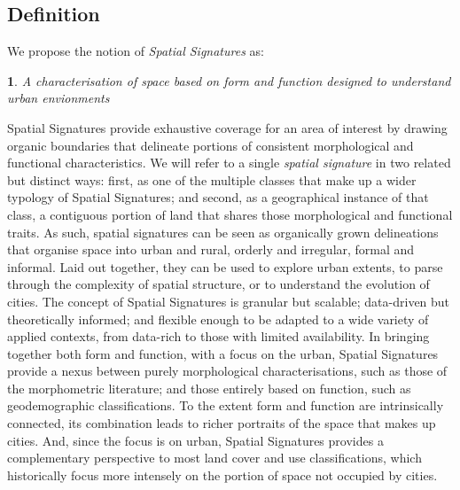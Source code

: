 \subsection{Definition}
\label{ssec:ss_def}

We propose the notion of \textit{Spatial Signatures} as:

\newtheorem*{theorem}{}
\begin{theorem}
A characterisation of space based on form and function designed to understand
urban envionments
\end{theorem}

Spatial Signatures provide exhaustive coverage for an area of interest by
drawing organic boundaries that delineate portions of consistent morphological
and functional characteristics.
%
We will refer to a single \textit{spatial signature} in two related but
distinct ways: first, as one of the multiple classes that make up a wider
typology of Spatial Signatures; and second, as a geographical instance of that
class, a contiguous portion of land that shares those morphological and
functional traits.
As such, spatial signatures can be seen as organically grown delineations that
organise space into urban and rural, orderly and irregular, formal and informal.
%
Laid out together, they can be used to explore urban extents, to parse through
the complexity of spatial structure, or to understand the evolution of cities.
The concept of Spatial Signatures is granular but scalable; data-driven but
theoretically informed; and flexible enough to be adapted to a wide variety of
applied contexts, from data-rich to those with limited availability.
In bringing together both form and function, with a focus on the urban,
Spatial Signatures provide a nexus between purely morphological
characterisations, such as those of the morphometric literature; and those
entirely based on function, such as geodemographic classifications.
%
To the extent form and function are intrinsically connected, its
combination leads to richer portraits of the space that makes up cities.
And, since the focus is on urban, Spatial Signatures provides a complementary
perspective to most land cover and use classifications, which historically
focus more intensely on the portion of space not occupied by cities.

